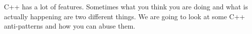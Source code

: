 \def\abstracttitle{Fun with C++}
\def\abstractcomment{Lightning Talk}
\def\abstractowner{Carly}

\thispagestyle{abstract}

C++ has a lot of features. Sometimes what you think you are doing and what is actually happening are two different things. We are going to look at some C++ anti-patterns and how you can abuse them.\\
